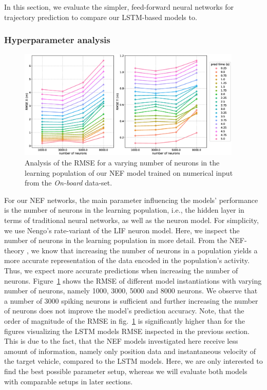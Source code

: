 In this section, we evaluate the simpler, feed-forward neural networks for trajectory prediction to compare our \ac{LSTM}-based models to.

\subsubsection{Hyperparameter analysis}%
\label{ssubsec:hyperparameter_analysis_nef}

\begin{figure}[t!]
  \centering
  \includegraphics[width=0.95\textwidth]{imgs/nef_num_neurons_analysis.eps}
  \caption{Analysis of the \ac{RMSE} for a varying number of neurons in the learning population of our \ac{NEF} model trained on numerical input from the \emph{On-board} data-set.}
  \label{fig:nef_num_neurons_analysis}
\end{figure}

For our \ac{NEF} networks, the main parameter influencing the models' performance is the number of neurons in the learning population, i.e., the hidden layer in terms of traditional neural networks, as well as the neuron model.
For simplicity, we use \acs{Nengo}'s rate-variant of the \ac{LIF} neuron model.
Here, we inspect the number of neurons in the learning population in more detail.
From the \ac{NEF}-theory \parencite{Eliasmith2003}, we know that increasing the number of neurons in a population yields a more accurate representation of the data encoded in the population's activity.
Thus, we expect more accurate predictions when increasing the number of neurons.
Figure~\ref{fig:nef_num_neurons_analysis} shows the \ac{RMSE} of different model instantiations with varying number of neurons, namely \num{1000}, \num{3000}, \num{5000} and \num{8000} neurons.
We observe that a number of \num{3000} spiking neurons is sufficient and further increasing the number of neurons does not improve the model's prediction accuracy.
Note, that the order of magnitude of the \ac{RMSE} in fig.~\ref{fig:nef_num_neurons_analysis} is significantly higher than for the figures visualizing the \ac{LSTM} models \ac{RMSE} inspected in the previous section. 
This is due to the fact, that the \ac{NEF} models investigated here receive less amount of information, namely only position data and instantaneous velocity of the target vehicle, compared to the \ac{LSTM} models.
Here, we are only interested to find the best possible parameter setup, whereas we will evaluate both models with comparable setups in later sections.

